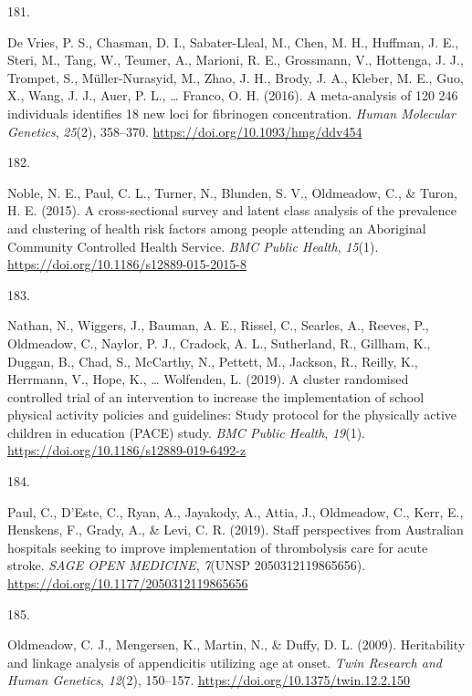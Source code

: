 \documentclass[11pt, a4paper]{awesome-cv}
\newlength{\csllabelwidth}
\newcommand{\CSLLeftMargin}[1]{\parbox[t]{\csllabelwidth}{#1}}
\newcommand{\CSLRightInline}[1]{\parbox[t]{\linewidth - \csllabelwidth}{#1}}
\begin{document}
\leavevmode\hypertarget{ref-de_vries_meta-analysis_2016}{}%
\CSLLeftMargin{181. }
\CSLRightInline{De Vries, P. S., Chasman, D. I., Sabater-Lleal, M.,
Chen, M. H., Huffman, J. E., Steri, M., Tang, W., Teumer, A., Marioni,
R. E., Grossmann, V., Hottenga, J. J., Trompet, S., Müller-Nurasyid, M.,
Zhao, J. H., Brody, J. A., Kleber, M. E., Guo, X., Wang, J. J., Auer, P.
L., \ldots{} Franco, O. H. (2016). A meta-analysis of 120 246
individuals identifies 18 new loci for fibrinogen concentration.
\emph{Human Molecular Genetics}, \emph{25}(2), 358--370.
\url{https://doi.org/10.1093/hmg/ddv454}}

\leavevmode\hypertarget{ref-noble_cross-sectional_2015}{}%
\CSLLeftMargin{182. }
\CSLRightInline{Noble, N. E., Paul, C. L., Turner, N., Blunden, S. V.,
Oldmeadow, C., \& Turon, H. E. (2015). A cross-sectional survey and
latent class analysis of the prevalence and clustering of health risk
factors among people attending an Aboriginal Community Controlled Health
Service. \emph{BMC Public Health}, \emph{15}(1).
\url{https://doi.org/10.1186/s12889-015-2015-8}}

\leavevmode\hypertarget{ref-nathan_cluster_2019}{}%
\CSLLeftMargin{183. }
\CSLRightInline{Nathan, N., Wiggers, J., Bauman, A. E., Rissel, C.,
Searles, A., Reeves, P., Oldmeadow, C., Naylor, P. J., Cradock, A. L.,
Sutherland, R., Gillham, K., Duggan, B., Chad, S., McCarthy, N.,
Pettett, M., Jackson, R., Reilly, K., Herrmann, V., Hope, K., \ldots{}
Wolfenden, L. (2019). A cluster randomised controlled trial of an
intervention to increase the implementation of school physical activity
policies and guidelines: Study protocol for the physically active
children in education (PACE) study. \emph{BMC Public Health},
\emph{19}(1). \url{https://doi.org/10.1186/s12889-019-6492-z}}

\leavevmode\hypertarget{ref-paul_staff_2019}{}%
\CSLLeftMargin{184. }
\CSLRightInline{Paul, C., D'Este, C., Ryan, A., Jayakody, A., Attia, J.,
Oldmeadow, C., Kerr, E., Henskens, F., Grady, A., \& Levi, C. R. (2019).
Staff perspectives from Australian hospitals seeking to improve
implementation of thrombolysis care for acute stroke. \emph{SAGE OPEN
MEDICINE}, \emph{7}(UNSP 2050312119865656).
\url{https://doi.org/10.1177/2050312119865656}}

\leavevmode\hypertarget{ref-oldmeadow_heritability_2009}{}%
\CSLLeftMargin{185. }
\CSLRightInline{Oldmeadow, C. J., Mengersen, K., Martin, N., \& Duffy,
D. L. (2009). Heritability and linkage analysis of appendicitis
utilizing age at onset. \emph{Twin Research and Human Genetics},
\emph{12}(2), 150--157. \url{https://doi.org/10.1375/twin.12.2.150}}
\end{document}
